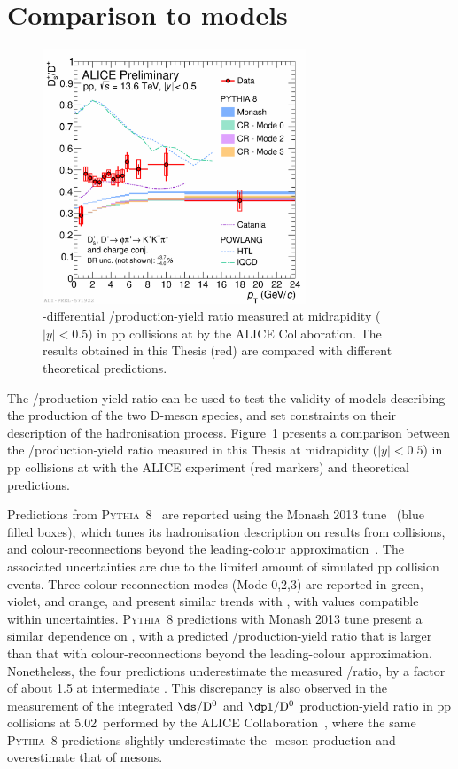 \section{Comparison to models}
\begin{figure}[htb]
    \centering
    \includegraphics[width=0.7\textwidth]{Figures/Chapter 7/dsoverdpluscomparisonmodels_0.pdf}
    \caption{\pt-differential \ds/\dpl production-yield ratio measured at midrapidity ($\lvert y\rvert<0.5$) in pp collisions at \thirteen by the ALICE Collaboration. The results obtained in this Thesis (red) are compared with different theoretical predictions.}
    \label{fig:dsdplvsmodels}
\end{figure}
The \ds/\dpl production-yield ratio can be used to test the validity of models describing the production of the two D-meson species, and set constraints on their description of the hadronisation process. Figure~\ref{fig:dsdplvsmodels} presents a comparison between the \ds/\dpl production-yield ratio measured in this Thesis at midrapidity ($\lvert y\rvert<0.5$) in pp collisions at \thirteen with the ALICE experiment (red markers) and theoretical predictions. 

Predictions from \textsc{Pythia}~8~\cite{Bierlich:2022pfr} are reported using the Monash 2013 tune~\cite{Skands:2014pea} (blue filled boxes), which tunes its hadronisation description on results from \ee collisions, and colour-reconnections beyond the leading-colour approximation~\cite{Christiansen:2015yqa}. The associated uncertainties are due to the limited amount of simulated pp collision events. Three colour reconnection modes (Mode 0,2,3) are reported in green, violet, and orange, and present similar trends with \pt, with values compatible within uncertainties. \textsc{Pythia}~8 predictions with Monash 2013 tune present a similar dependence on \pt, with a predicted \ds/\dpl production-yield ratio that is larger than that with colour-reconnections beyond the leading-colour approximation. Nonetheless, the four predictions underestimate the measured \ds/\dpl ratio, by a factor of about 1.5 at intermediate \pt. This discrepancy is also observed in the measurement of the \pt integrated $\ds/\mathrm{D^0}$ and $\dpl/\mathrm{D^0}$ production-yield ratio in pp collisions at 5.02~\tev performed by the ALICE Collaboration~\cite{ALICE:2021dhb}, where the same \textsc{Pythia}~8 predictions slightly underestimate the \ds-meson production and overestimate that of \dpl mesons.

